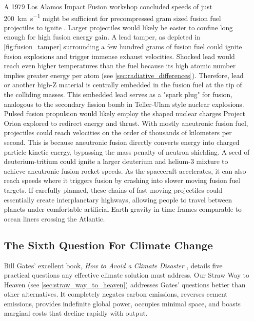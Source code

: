\documentclass{article}
\begin{document}
A 1979 Los Alamos Impact Fusion workshop concluded speeds of just \SI{200}{\kilo\meter\per\second} might be sufficient for precompressed gram sized fusion fuel projectiles to ignite \cite{impactfusion1979}.   Larger projectiles would likely be easier to confine long enough for high fusion energy gain.   A lead tamper, as depicted in \autoref{fig:fusion_tamper} surrounding a few hundred grams of fusion fuel could ignite fusion explosions and trigger immense exhaust velocities.  Shocked lead would reach even higher temperatures than the fuel because its high atomic number implies greater energy per atom (see \autoref{sec:radiative_differences}).  Therefore, lead or another high-Z material is centrally embedded in the fusion fuel at the tip of the colliding masses. This embedded lead serves as a "spark plug" for fusion, analogous to the secondary fission bomb in Teller-Ulam style \cite{WikipediaThermonuclearWeapon} nuclear explosions.   Pulsed fusion propulsion would likely employ the shaped nuclear charges Project Orion explored to redirect energy and thrust.  
With mostly aneutronic fusion fuel, projectiles could reach velocities on the order of thousands of kilometers per second.  This is because aneutronic fusion directly converts energy into charged particle kinetic energy, bypassing the mass penalty of neutron shielding.  A seed of deuterium-tritium could ignite a larger deuterium and helium-3 mixture to achieve aneutronic fusion rocket speeds.   As the spacecraft accelerates, it can also reach speeds where it triggers fusion by crashing into slower moving fusion fuel targets.   If carefully planned, these chains of fast-moving projectiles could essentially create interplanetary highways, allowing people to travel between planets under comfortable artificial Earth gravity in time frames comparable to ocean liners crossing the Atlantic.  

\subsection{The Sixth Question For Climate Change}\label{sec:sith_question}
Bill Gates' excellent book, \textit{How to Avoid a Climate Disaster} \cite{gates2021avoid}, details five practical questions \cite{breakthroughenergy_2021_five} any effective climate solution must address. Our Straw Way to Heaven (see \autoref{sec:straw_way_to_heaven}) addresses Gates' questions better than other alternatives. It completely negates carbon emissions, reverses cement emissions, provides indefinite global power, occupies minimal space, and boasts marginal costs that decline rapidly with output.
\end{document}
